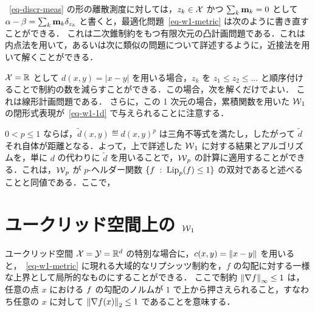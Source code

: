 ~\eqref{eq-discr-meas} の形の離散測度に対しては，$z_k \in \mathcal{X}$ かつ $\sum_k \mathrm{\textbf{m}}_k=0$ として $\alpha-\beta = \sum_{k} \mathrm{\textbf{m}}_k \delta_{z_k}$ と書くと，最適化問題~\eqref{eq-w1-metric} は次のように書き直すことができる．
これは二次錐制約をもつ有限次元の凸計画問題である．これは内点法を用いて，あるいは次に類似の問題について詳述するように，近接法を用いて解くことができる．

$\mathcal{X}=\mathbb{R}$ として $d(x,y)=|x-y|$ を用いる場合，$z_k$ を $z_1 \leq z_2 \leq \ldots$ と順序付けることで制約の数を減らすことができる．この場合，次を解くだけでよい．
これは線形計画問題である．
%
さらに，この 1 次元の場合，累積関数を用いた $\operatorname{\mathcal{W}}_1$ の閉形式表現が~\eqref{eq-w1-1d} で与えられることに注意する．

\begin{rem}
	$0<p \leq 1$ ならば，$\tilde d(x,y) \eqdef d(x,y)^p$ は三角不等式を満たし，したがって $\tilde d$ それ自体が距離となる．よって，上で詳述した $\operatorname{\mathcal{W}}_1$ に対する結果とアルゴリズムを，単に $d$ の代わりに $\tilde d$ を用いることで，$\operatorname{\mathcal{W}}_p$ の計算に適用することができる．これは，$\operatorname{\mathcal{W}}_p$ が $p$-ヘルダー関数 $\{ f \;:\; \operatorname{Lip}_p(f) \leq 1 \}$ の双対であると述べることと同値である．ここで，
\end{rem}

\section{ユークリッド空間上の $\operatorname{\mathcal{W}}_1$}
\label{sec-w1-eucl}


ユークリッド空間 $\mathcal{X}=\mathcal{Y}=\mathbb{R}^d$ の特別な場合に，$c(x,y) = \left\| x-y \right\|$ を用いると，~\eqref{eq-w1-metric} に現れる大域的なリプシッツ制約を，$f$ の勾配に対する一様な上界として局所的なものにすることができる．
ここで制約 $\left\| \nabla f \right\|_\infty \leq 1$ は，任意の点 $x$ における $f$ の勾配のノルムが $1$ で上から押さえられること，すなわち任意の $x$ に対して $\left\| \nabla f(x) \right\|_2 \leq 1$ であることを意味する．

